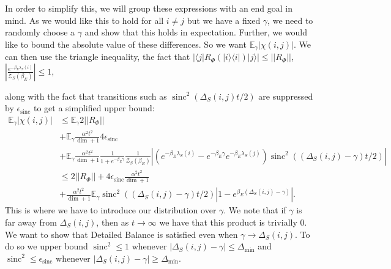 \documentclass{article}
\newcommand{\ket}[1]{|#1\rangle}
\newcommand{\bra}[1]{\langle #1|}
\newcommand{\ketbra}[2]{| #1\rangle\! \langle #2|}
\newcommand{\parens}[1]{\left( #1 \right)}
\newcommand{\abs}[1]{\left| #1 \right|}
\newcommand{\norm}[1]{\left| \left| #1 \right| \right|}
\newcommand{\partfun}{\mathcal{Z}}
\DeclareMathOperator{\sinc}{sinc}
\begin{document}
In order to simplify this, we will group these expressions with an end goal in mind. As we would like this to hold for all $i \neq j$ but we have a fixed $\gamma$, we need to randomly choose a $\gamma$ and show that this holds in expectation. Further, we would like to bound the absolute value of these differences. So we want $\mathbb{E}_{\gamma}\abs{\chi(i,j)}$. We can then use the triangle inequality, the fact that $\abs{\bra{j}R_{\Phi}(\ketbra{i}{i})\ket{j}} \leq \norm{R_{\Phi}}$, $\abs{\frac{e^{-\beta_E \lambda_S(i)}}{\partfun_S(\beta_E)}} \leq 1$, 

along with the fact that transitions such as $\sinc^2(\Delta_S(i,j)t/2)$ are suppressed by $\epsilon_{\sinc}$ to get a simplified upper bound:
\begin{align}
    \mathbb{E}_{\gamma} \abs{\chi(i,j)} &\leq \mathbb{E}_{\gamma} 2 \norm{R_{\Phi}} \nonumber \\
    &+ \mathbb{E}_{\gamma} \frac{\alpha^2 t^2}{\dim + 1} 4 \epsilon_{\sinc}  \nonumber \\
    &+ \mathbb{E}_{\gamma} \frac{\alpha^2 t^2}{\dim + 1} \frac{1}{1 + e^{-\beta_E \gamma}} \frac{1}{\partfun_S(\beta_E)} \abs{\parens{e^{-\beta_E \lambda_S(i)} - e^{-\beta_E \gamma} e^{-\beta_E \lambda_S(j)}} \sinc^2((\Delta_S(i,j) - \gamma) t/2)} \\
    &\leq 2 \norm{R_{\Phi}} + 4 \epsilon_{\sinc} \frac{\alpha^2 t^2}{\dim + 1} \nonumber \\
    &+ \frac{\alpha^2 t^2}{\dim + 1} \mathbb{E}_{\gamma} \sinc^2((\Delta_S(i,j) - \gamma) t/2) \abs{1 - e^{\beta_E (\Delta_S(i,j) - \gamma)}}. \label{eq:detailed_balance_upper_bound}
\end{align}
This is where we have to introduce our distribution over $\gamma$. We note that if $\gamma$ is far away from $\Delta_S(i,j)$, then as $t \to \infty$ we have that this product is trivially 0. We want to show that Detailed Balance is satisfied even when $\gamma \to \Delta_S(i,j)$. To do so we upper bound $\sinc^2 \leq 1$ whenever $\abs{\Delta_S(i,j) - \gamma} \leq \Delta_{\min}$ and $\sinc^2 \leq \epsilon_{\sinc}$ whenever $\abs{\Delta_S(i,j) - \gamma} \geq \Delta_{\min}$. 
\end{document}
